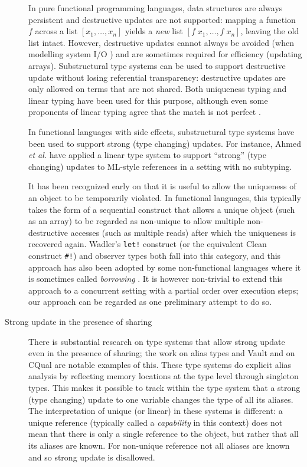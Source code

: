 \documentclass[copyright]{eptcs}
\begin{document}
\begin{description}
In pure functional programming languages, data structures are always persistent
and destructive updates are not supported: mapping a function $f$ across a list
$[x_1, \ldots, x_n]$ yields a \textit{new} list $[f \; x_1, \ldots, f \; x_n]$,
leaving the old list intact. However, destructive updates cannot always be
avoided (\eg when modelling system I/O \cite{achten:cleanio}) and are sometimes
required for efficiency  (\eg updating arrays). Substructural type systems can
be used to support destructive update without losing referential transparency:
destructive updates are only allowed on terms that are not shared. Both
uniqueness typing \cite{barendsen:functional} and linear typing have been used
for this purpose, although even some proponents of linear typing agree that the
match is not perfect \cite[Section 3]{wadler:use}. 

In functional languages with side effects, substructural type systems have been
used to support strong (type changing) updates. For instance, Ahmed \textit{et
al.} have applied a linear type system to support ``strong'' (type changing)
updates to ML-style references \cite{ahmed:stepindexed} in a setting with no subtyping.  

It has been recognized early on that it is useful to allow the uniqueness of an
object to be temporarily violated. In functional languages, this typically
takes the form of a sequential construct that allows a unique object (such as
an array) to be regarded as non-unique to allow multiple non-destructive
accesses (such as multiple reads) after which the uniqueness is recovered
again. Wadler's \texttt{let!} construct \cite{wadler:change} (or the equivalent
Clean construct \texttt{\#!}) and observer types \cite{odersky:observers} both
fall into this category, and this approach has also been adopted by some
non-functional languages where it is sometimes called \textit{borrowing}
\cite{clarke:external}. It is however non-trivial to extend this approach to a
concurrent setting with a partial order over execution steps; our approach  can
be regarded as one preliminary attempt to do so.  

\item[Strong update in the presence of sharing]

There is substantial research on type systems that
allow strong update even in the presence of sharing; the work on alias types
and Vault \cite{smith:2000,walker:2001,fahndrich:2002} and on CQual
\cite{foster:2002} are notable examples of this. These type systems do explicit
alias analysis by reflecting memory locations at the type level through
singleton types. This makes it possible to track within the type system that a
strong (type changing) update to one variable changes the type of all its
aliases. The interpretation of unique (or linear) in these systems is
different: a unique reference (typically called a \textit{capability} in this
context) does not mean that there is only a single reference to the object, but
rather that all its aliases are known. For non-unique reference not all aliases
are known and so strong update is disallowed. 


\end{description}
\end{document}
